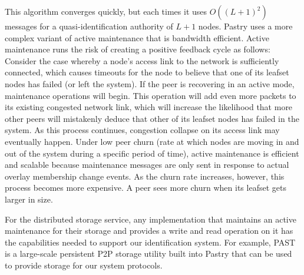  This algorithm converges quickly, but each times it uses $O((L+1)^2)$ messages
for a quasi-identification authority of $L+1$ nodes.
Pastry uses a more complex variant of active maintenance that is
bandwidth efficient.
Active maintenance runs the risk of creating a positive feedback cycle as
follows: Consider the case whereby a node's access link to the network is
sufficiently connected, which causes timeouts for the node to believe that one
of its leafset nodes has failed (or left the system). If the peer is recovering
in an active mode, maintenance operations will begin. This operation will add
even more packets to its existing congested network link, which will increase
the likelihood that more other peers will mistakenly deduce that other of its leafset
nodes has failed in the system. As this process continues, congestion collapse
on its access link may eventually happen.
Under low peer churn (rate at which nodes are moving in and out of the
system during a specific period of time), active maintenance is efficient and scalable because
maintenance messages are only sent in response to actual overlay membership
change events. As the churn rate increases, however, this process becomes more
expensive. A peer sees more churn when its leafset gets larger in size.

For the distributed storage service, any implementation that maintains an
active maintenance for their storage and provides a write and read operation on
it has the capabilities needed to support our identification system. For
example, PAST~\cite{druschel2001past} is a large-scale persistent P2P storage
utility built into Pastry that can be used to provide storage for our system
protocols.



%

